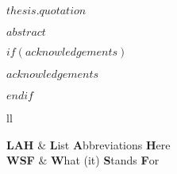\documentclass[
12pt, %
singlespacing, %
liststotoc, %
toctotoc, %
nohyperref, %
headsepline, %
]{MastersDoctoralThesis} %
\begin{document}
\vspace*{0.2\textheight}


$thesis.quotation$
%


\addchaptertocentry{\abstractname} %
$abstract$


$if(acknowledgements)$
\begin{acknowledgements}
\addchaptertocentry{\acknowledgementname} %
$acknowledgements$
\end{acknowledgements}
$endif$


\tableofcontents %

\listoffigures %

\listoftables %


\begin{abbreviations}{ll} %

\textbf{LAH} & \textbf{L}ist \textbf{A}bbreviations \textbf{H}ere\\
\textbf{WSF} & \textbf{W}hat (it) \textbf{S}tands \textbf{F}or\\

\end{abbreviations}
\end{document}
